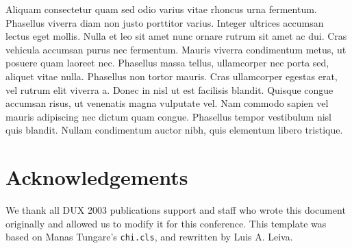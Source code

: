 \documentclass{chi-ext}
\begin{document}
Aliquam consectetur quam sed odio varius vitae rhoncus urna fermentum. Phasellus viverra diam non justo porttitor varius. Integer ultrices accumsan lectus eget mollis. Nulla et leo sit amet nunc ornare rutrum sit amet ac dui. Cras vehicula accumsan purus nec fermentum. Mauris viverra condimentum metus, ut posuere quam laoreet nec. Phasellus massa tellus, ullamcorper nec porta sed, aliquet vitae nulla. Phasellus non tortor mauris. Cras ullamcorper egestas erat, vel rutrum elit viverra a. Donec in nisl ut
est facilisis blandit. Quisque congue accumsan risus, ut venenatis magna vulputate vel. Nam commodo sapien vel mauris adipiscing nec dictum quam congue. Phasellus tempor vestibulum nisl quis blandit. Nullam condimentum auctor nibh, quis elementum libero tristique.



\section{Acknowledgements}
We thank all DUX 2003 publications support and staff who wrote this document originally and allowed us to modify it for this conference.
This template was based on Manas Tungare's \texttt{chi.cls}, and rewritten by Luis A. Leiva.

\balance


\end{document}
